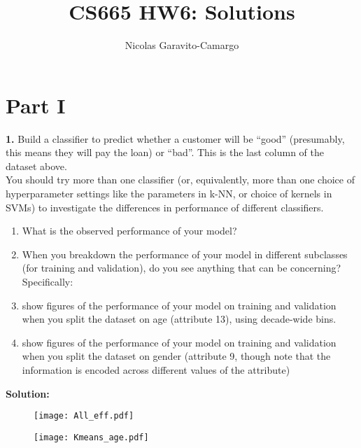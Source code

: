 \documentclass[14pt]{article}
\title{CS665 HW6: Solutions}
\author{Nicolas Garavito-Camargo}
\begin{document}
\maketitle

\section*{Part I}

\begin{mdframed}
\textbf{1.} Build a classifier to predict whether a customer will be
``good”
(presumably, this means they will pay the loan) or ``bad”. This is the
last column of the dataset above.\\

You should try more than one classifier (or, equivalently, more than
one choice of hyperparameter settings like the parameters in k-NN, or
choice of kernels in SVMs) to investigate the differences in
performance of different classifiers.

\begin{enumerate}
\item What is the observed performance of your model?

\item When you breakdown the performance of your model in different
subclasses (for training and validation), do you see anything that can
be concerning? Specifically:

\item  show figures of the performance of your model on training and
validation when you split the dataset on age (attribute 13), using
decade-wide bins.

\item  show figures of the performance of your model on training and
validation when you split the dataset on gender (attribute 9, though
note that the information is encoded across different values of the
attribute)


\end{enumerate}

\end{mdframed}

\textbf{Solution:}\\

\begin{figure}[H]
\centering
\texttt{[image: All\_eff.pdf]}
\end{figure}


\begin{figure}[H]
\centering
\texttt{[image: Kmeans\_age.pdf]}
\end{figure}
\end{document}
